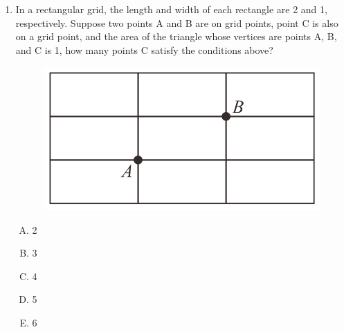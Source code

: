 \documentclass[12pt]{scrartcl}
\begin{document}
\begin{enumerate}
    \item In a rectangular grid, the length and width of each rectangle are 2 and 1, respectively. Suppose two points A and B are on grid points, point C is also on a grid point, and the area of the triangle whose vertices are points A, B, and C is 1, how many points C satisfy the conditions above?
    \begin{figure}[h]
        \centering
        \includegraphics[scale=0.4]{StarGen/0Figure/wmi2023G6A-num12.png}
    \end{figure}
    \begin{multicols}{5}
        \begin{enumerate}[(A)]
            \item 2
            \item 3
            \item 4
            \item 5
            \item 6
        \end{enumerate}
    \end{multicols} \hrulefill


\end{enumerate}
\end{document}
